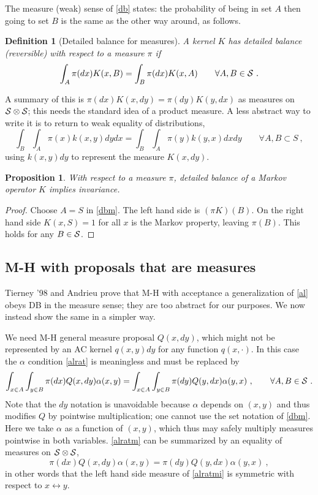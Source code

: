 \documentclass[10pt]{article}
\newcommand{\be}{\begin{equation}}
\newcommand{\ee}{\end{equation}}
\newtheorem{pro}[thm]{Proposition}
\newtheorem{dfn}[thm]{Definition}
\newcommand{\al}{\alpha}
\begin{document}
The measure (weak) sense of \eqref{db}
states: the probability of being in set $A$ then going to
set $B$ is the same as the other way around, as follows.
\begin{dfn}[Detailed balance for measures]
  A kernel $K$ has detailed balance (reversible) with respect to
  a measure $\pi$ if
  \be
  \int_A \pi(dx) K(x,B) = \int_B \pi(dx) K(x,A) \qquad \forall A,B \in \cal S~.
  \label{dbm}
  \ee
  \label{d:dbm}
\end{dfn}
A summary of this is $\pi(dx) K(x,dy) = \pi(dy) K(y,dx)$ as measures
on $\cal S \otimes \cal S$; this needs the standard idea of a product measure.
A less abstract way to write it is to return to weak equality of
distributions,
$$
\int_B \int_A \pi(x) k(x,y) dy dx =
\int_B \int_A \pi(y) k(y,x) dx dy \qquad \forall A,B \subset S~,
$$
using $k(x,y)dy$ to represent the measure $K(x,dy)$.

\begin{pro}
  With respect to a measure $\pi$, detailed balance of a Markov operator $K$ implies invariance.
  \label{p:dbim}
\end{pro}
\begin{proof}
  Choose $A=S$ in \eqref{dbm}. The left hand side is $(\pi K)(B)$.
  On the right hand side $K(x,S)=1$ for all $x$ is the Markov property,
  leaving $\pi(B)$. This holds for any $B\in \cal S$.
\end{proof}


\subsection{M-H with proposals that are measures}

Tierney '98 and Andrieu prove that M-H with acceptance a generalization of
\eqref{al}
obeys DB in the measure sense; they are too abstract for our purposes.
We now instead show the same in a simpler way.

We need M-H general measure proposal $Q(x,dy)$, which might not
be represented by an AC kernel $q(x,y)dy$ for any function $q(x,\cdot)$.
In this case the $\al$ condition \eqref{alrat} is meaningless and must be replaced by
\be
\int_{x\in A} \int_{y \in B} \pi(dx) Q(x,dy) \al(x,y) = \int_{x\in A} \int_{y\in B} \pi(dy) Q(y,dx) \al(y,x)~, \qquad \forall A,B \in \cal S~.
\label{alratm}
\ee
Note that the $dy$ notation is unavoidable because
$\al$ depends on $(x,y)$ and thus modifies $Q$ by pointwise multiplication;
one cannot use the set notation of \eqref{dbm}.
Here we take $\al$ as a function of $(x,y)$, which thus may safely multiply
measures pointwise in both variables.
\eqref{alratm} can be summarized by an equality of
measures on $\cal S \otimes \cal S$,
\be
\pi(dx) Q(x,dy) \al(x,y) = \pi(dy) Q(y,dx) \al(y,x)~,
\label{alratmi}
\ee
in other words that the left hand side measure of \eqref{alratmi} is symmetric
with respect to $x\leftrightarrow y$.
\end{document}
